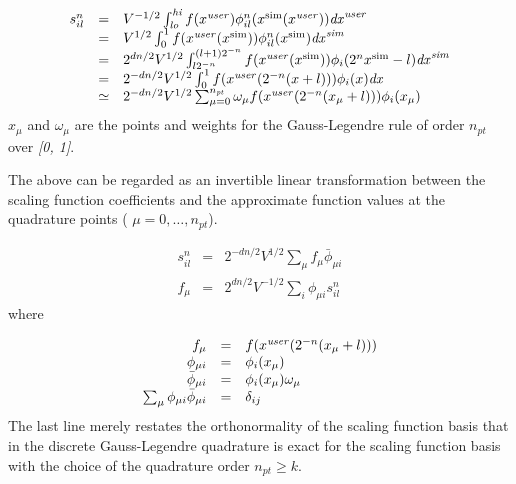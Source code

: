 \documentclass[letterpaper]{article}
\begin{document}
\begin{equation}
\begin{matrix}s_{il}^{n}&\text{=}&V^{-1/2}\int
_{\mathrm{{\mathit{lo}}}}^{\mathrm{{\mathit{hi}}}}{f(x^{\mathrm{{\mathit{user}}}})\phi
_{il}^{n}(x^{\mathrm{{sim}}}(x^{\mathrm{{\mathit{user}}}}))\mathit{dx}^{\mathrm{{\mathit{user}}}}}\hfill\null
\\&\text{=}&V^{1/2}\int _{0}^{1}{f(x^{\mathrm{{\mathit{user}}}}(x^{\mathrm{{sim}}}))\phi
_{il}^{n}(x^{\mathrm{{sim}}})\mathit{dx}^{\mathrm{{\mathit{sim}}}}}\hfill\null \\&\text{=}&2^{dn/2}V^{1/2}\int
_{l2^{-n}}^{(l+1)2^{-n}}{f(x^{\mathrm{{\mathit{user}}}}(x^{\mathrm{{sim}}}))\phi
_{i}(2^{n}x^{\mathrm{{sim}}}-l)\mathit{dx}^{\mathrm{{\mathit{sim}}}}}\hfill\null \\&\text{=}&2^{-dn/2}V^{1/2}\int
_{0}^{1}{f(x^{\mathrm{{\mathit{user}}}}(2^{-n}(x+l)))\phi _{i}(x)\mathit{dx}}\hfill\null \\&\simeq
&2^{-dn/2}V^{1/2}\sum _{\mu =0}^{n_{\mathrm{{\mathit{pt}}}}}{\omega _{\mu }f(x^{\mathrm{{\mathit{user}}}}(2^{-n}(x_{\mu
}+l)))\phi _{i}(x_{\mu })}\hfill\null \end{matrix}
\end{equation}
 $x_{\mu }$ and  $\omega _{\mu }$ are the points and weights for the Gauss-Legendre rule of order 
$n_{\mathrm{{\mathit{pt}}}}$ over \textit{[0, 1]}.

The above can be regarded as an invertible linear transformation between the scaling function coefficients and the
approximate function values at the quadrature points ( $\mu =0,\ldots ,n_{\mathrm{{\mathit{pt}}}}$). 

\begin{equation}\label{seq:refText21}
\begin{matrix}s_{il}^{n}&\text{=}&2^{-dn/2}V^{1/2}\sum _{\mu }f_{\mu }{\bar{\phi }}_{\mu i}\\f_{\mu
}&\text{=}&2^{dn/2}V^{-1/2}\sum _{i}\phi _{\mu i}s_{il}^{n}\end{matrix}
\end{equation}
where 

\begin{equation}
\begin{matrix}\hfill f_{\mu }&\text{=}&f(x^{\mathrm{{\mathit{user}}}}(2^{-n}(x_{\mu }+l)))\hfill\null \\\hfill \phi
_{\mu i}&\text{=}&\phi _{i}(x_{\mu })\hfill\null \\\hfill {\bar{\phi }}_{\mu i}&\text{=}&\phi _{i}(x_{\mu })\omega
_{\mu }\hfill\null \\\hfill \sum _{\mu }\phi _{\mu i}{\bar{\phi }}_{\mu i}&\text{=}&\delta _{ij}\hfill\null
\end{matrix}
\end{equation}
The last line merely restates the orthonormality of the scaling function basis that in the discrete Gauss-Legendre
quadrature is exact for the scaling function basis with the choice of the quadrature order 
$n_{\mathrm{{\mathit{pt}}}}\ge k$.
\end{document}
